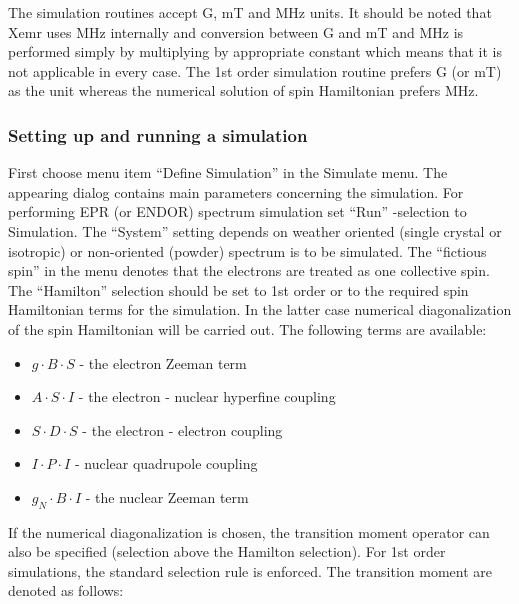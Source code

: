 \documentclass[byrevtex,amssymb,aps,pra,floatfix,letterpaper]{revtex4}
\begin{document}
The simulation routines accept G, mT and MHz units. It should be noted that Xemr uses MHz internally and conversion between G and mT and MHz is performed simply by multiplying by appropriate constant which means that it is not applicable in every case. The 1st order simulation routine prefers G (or mT) as the unit whereas the numerical solution of spin Hamiltonian prefers MHz.

\subsubsection{Setting up and running a simulation}

First choose menu item ``Define Simulation'' in the Simulate menu. The appearing dialog contains main parameters concerning the simulation. For performing EPR (or ENDOR) spectrum simulation set ``Run'' -selection to Simulation. The ``System'' setting depends on weather oriented (single crystal or isotropic) or non-oriented (powder) spectrum is to be simulated. The ``fictious spin'' in the menu denotes that the electrons are treated as one collective spin. The ``Hamilton'' selection should be set to 1st order or to the required spin Hamiltonian terms for the simulation. In the latter case numerical diagonalization of the spin Hamiltonian will be carried out. The following terms are available:

\begin{itemize}
\item $g\cdot B\cdot S$ - the electron Zeeman term
\item $A\cdot S\cdot I$ - the electron - nuclear hyperfine coupling
\item $S\cdot D\cdot S$ - the electron - electron coupling
\item $I\cdot P\cdot I$ - nuclear quadrupole coupling
\item $g_N\cdot B\cdot I$ - the nuclear Zeeman term
\end{itemize}

\noindent
If the numerical diagonalization is chosen, the transition moment operator can also be specified (selection above the Hamilton selection). For 1st order simulations, the standard selection rule is enforced. The transition moment are denoted as follows:
\end{document}
